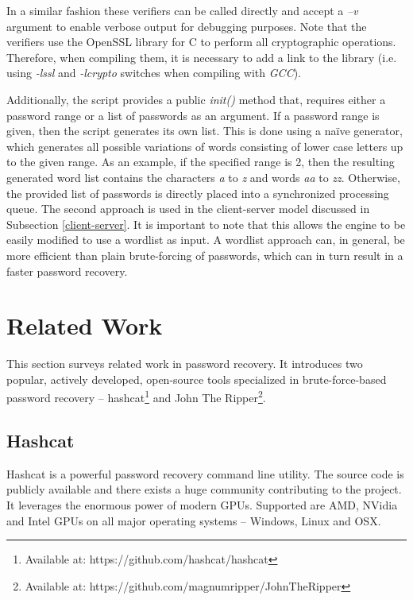 \documentclass[11pt,oneside]{fithesis2}
\begin{document}
In a similar fashion these verifiers can be called directly and accept a \textit{–v} argument to enable verbose output for debugging purposes. Note that the verifiers use the OpenSSL library for C \cite{openssl} to perform all cryptographic operations. Therefore, when compiling them, it is necessary to add a link to the library (i.e. using \textit{-lssl} and \textit{-lcrypto} switches when compiling with \textit{GCC}).

Additionally, the script provides a public \textit{init()} method that, requires either a password range or a list of passwords as an argument. If a password range is given, then the script generates its own list. This is done using a naïve generator, which generates all possible variations of words consisting of lower case letters up to the given range. As an example, if the specified range is 2, then the resulting generated word list contains the characters \textit{a} to \textit{z} and words \textit{aa} to \textit{zz}. Otherwise, the provided list of passwords is directly placed into a synchronized processing queue. The second approach is used in the client-server model discussed in Subsection \ref{client-server}. It is important to note that this allows the engine to be easily modified to use a wordlist as input. A wordlist approach can, in general, be more efficient than plain brute-forcing of passwords, which can in turn result in a faster password recovery.

\section{Related Work}\label{related_work}

This section surveys related work in password recovery. It introduces two popular, actively developed, open-source tools specialized in brute-force-based password recovery -- hashcat\footnote{Available at: https://github.com/hashcat/hashcat} and John The Ripper\footnote{Available at: https://github.com/magnumripper/JohnTheRipper}.

\subsection{Hashcat}

Hashcat is a powerful password recovery command line utility. The source code is publicly available and there exists a huge community contributing to the project. It leverages the enormous power of modern GPUs. Supported are AMD, NVidia and Intel GPUs on all major operating systems -- Windows, Linux and OSX.
\end{document}
